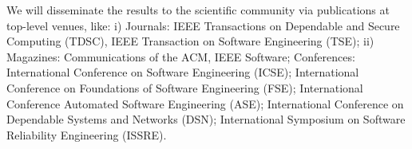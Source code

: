 \documentclass[12pt]{article}
\begin{document}
 We will disseminate the results to the scientific community via publications at top-level venues, like: i) Journals: IEEE Transactions on Dependable and Secure Computing (TDSC), IEEE Transaction on Software Engineering (TSE); 
ii) Magazines: Communications of the ACM, IEEE Software; Conferences: 
International Conference on Software Engineering (ICSE);  International Conference on Foundations of Software Engineering (FSE); International Conference 
Automated Software Engineering (ASE); International Conference on Dependable Systems and Networks (DSN); International Symposium on Software Reliability Engineering (ISSRE).

%

\vspace{-.3cm}



\end{document}
